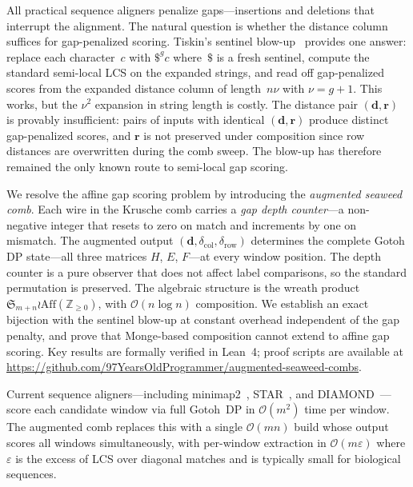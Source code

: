 \documentclass[11pt, a4paper]{article}
\theoremstyle{definition}
\theoremstyle{remark}
\newcommand{\dcol}{\mathbf{d}}
\newcommand{\drow}{\mathbf{r}}
\newcommand{\bigO}{\mathcal{O}}
\begin{document}
All practical sequence aligners penalize gaps---insertions and deletions that interrupt the alignment.
The natural question is whether the distance column suffices for gap-penalized scoring.
Tiskin's sentinel blow-up~\cite{tiskin2008semi,tiskin2019bounded} provides one answer: replace each character~$c$ with $\$^g c$ where~$\$$ is a fresh sentinel, compute the standard semi-local LCS on the expanded strings, and read off gap-penalized scores from the expanded distance column of length~$n\nu$ with $\nu = g{+}1$.
This works, but the $\nu^2$ expansion in string length is costly.
The distance pair $(\dcol, \drow)$ is provably insufficient: pairs of inputs with identical $(\dcol, \drow)$ produce distinct gap-penalized scores, and $\drow$ is not preserved under composition since row distances are overwritten during the comb sweep.
The blow-up has therefore remained the only known route to semi-local gap scoring.

We resolve the affine gap scoring problem by introducing the \emph{augmented seaweed comb}.
Each wire in the Krusche comb carries a \emph{gap depth counter}---a non-negative integer that resets to zero on match and increments by one on mismatch.
The augmented output $(\dcol, \delta_{\mathrm{col}}, \delta_{\mathrm{row}})$ determines the complete Gotoh DP state---all three matrices $H$, $E$, $F$---at every window position.
The depth counter is a pure observer that does not affect label comparisons, so the standard permutation is preserved.
The algebraic structure is the wreath product $\mathfrak{S}_{m+n} \wr \mathrm{Aff}(\mathbb{Z}_{\geq 0})$, with $\bigO(n \log n)$ composition.
We establish an exact bijection with the sentinel blow-up at
constant overhead independent of the gap penalty, and prove that
Monge-based composition cannot extend to affine gap scoring.
Key results are formally verified in Lean~4; proof scripts are
available at
\url{https://github.com/97YearsOldProgrammer/augmented-seaweed-combs}.

\begin{sloppypar}
Current sequence
aligners---including minimap2~\cite{li2018minimap2},
STAR~\cite{dobin2013star}, and
DIAMOND~\cite{buchfink2015diamond}---score each candidate window
via full Gotoh~DP in $\bigO(m^2)$ time per window.  The augmented
comb replaces this with a single $\bigO(mn)$ build whose output
scores all windows simultaneously, with per-window extraction in
$\bigO(m\varepsilon)$ where $\varepsilon$ is the excess of LCS
over diagonal matches and is typically small for biological
sequences.
\end{sloppypar}
\end{document}
